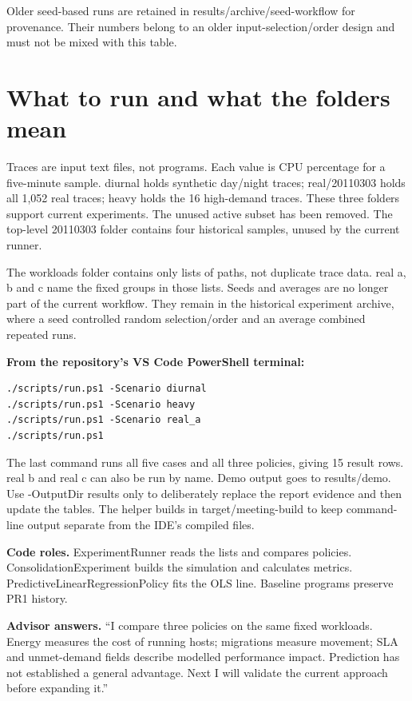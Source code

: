 \documentclass[11pt,a4paper]{article}
\begin{document}
Older seed-based runs are retained in results/archive/seed-workflow for provenance. Their numbers belong to an older input-selection/order design and must not be mixed with this table.
\newpage
\section{What to run and what the folders mean}
Traces are input text files, not programs. Each value is CPU percentage for a five-minute sample. diurnal holds synthetic day/night traces; real/20110303 holds all 1,052 real traces; heavy holds the 16 high-demand traces. These three folders support current experiments. The unused active subset has been removed. The top-level 20110303 folder contains four historical samples, unused by the current runner.

The workloads folder contains only lists of paths, not duplicate trace data. real a, b and c name the fixed groups in those lists. Seeds and averages are no longer part of the current workflow. They remain in the historical experiment archive, where a seed controlled random selection/order and an average combined repeated runs.

\textbf{From the repository's VS Code PowerShell terminal:}
\begin{verbatim}
./scripts/run.ps1 -Scenario diurnal
./scripts/run.ps1 -Scenario heavy
./scripts/run.ps1 -Scenario real_a
./scripts/run.ps1
\end{verbatim}
The last command runs all five cases and all three policies, giving 15 result rows. real b and real c can also be run by name. Demo output goes to results/demo. Use -OutputDir results only to deliberately replace the report evidence and then update the tables. The helper builds in target/meeting-build to keep command-line output separate from the IDE's compiled files.

\textbf{Code roles.} ExperimentRunner reads the lists and compares policies. ConsolidationExperiment builds the simulation and calculates metrics. PredictiveLinearRegressionPolicy fits the OLS line. Baseline programs preserve PR1 history.

\textbf{Advisor answers.} ``I compare three policies on the same fixed workloads. Energy measures the cost of running hosts; migrations measure movement; SLA and unmet-demand fields describe modelled performance impact. Prediction has not established a general advantage. Next I will validate the current approach before expanding it.''
\end{document}
